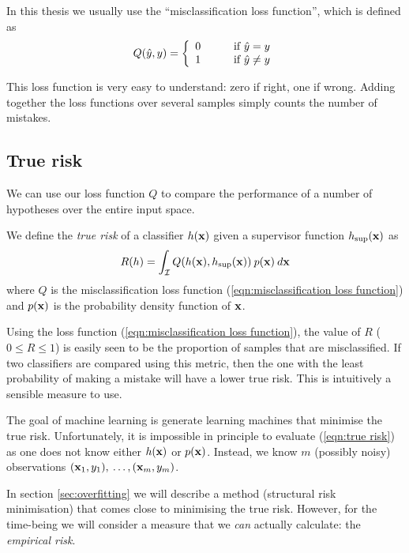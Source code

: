 In this thesis we usually use the ``misclassification loss function'',
which is defined as 
%
\begin{equation}
Q(\hat{y}, y) = \left\{
\begin{array}{ll}
	0	&	\qquad \mbox{if $\hat{y} = y$} \\
	1	&	\qquad \mbox{if $\hat{y} \neq y$}
\end{array}
\right.
\label{eqn:misclassification loss function}
\end{equation}

This loss function is very easy to understand: zero if right, one if
wrong.  Adding together the loss functions over several samples simply
counts the number of mistakes.


\subsection{True risk}
\label{sec:true risk}

We can use our loss function $Q$ to compare the performance of a
number of hypotheses over the entire input space.

\begin{definition}
We define the \emph{true risk} of a classifier $h(\mathbf{x})$ given a
supervisor function $h_{\sup}(\mathbf{x})$ as 
%
\begin{equation}
R(h) = \int_{\mathcal{I}} Q(h(\mathbf{x}), h_{\sup}(\mathbf{x})) \: p(\mathbf{x}) \: d\mathbf{x}
\label{eqn:true risk}
\end{equation}
%
where $Q$ is the misclassification loss function
(\ref{eqn:misclassification loss function}) and $p(\mathbf{x})$ is the
probability density function of $\mathbf{x}$.
\end{definition}

Using the loss function (\ref{eqn:misclassification loss function}), the
value of $R$ ($0 \leq R \leq 1$) is easily seen to be the proportion
of samples that are misclassified.  If two classifiers are compared
using this metric, then the one with the least probability of making a
mistake will have a lower true risk.  This is intuitively a sensible
measure to use.

The goal of machine learning is generate learning machines that
minimise the true risk.  Unfortunately, it is impossible in
principle to evaluate (\ref{eqn:true risk}) as one does not know
either $h(\mathbf{x})$ or $p(\mathbf{x})$.   Instead, we know $m$ (possibly noisy)
observations $(\mathbf{x}_1, y_1),\: \ldots, (\mathbf{x}_m, y_m)$.

In section \ref{sec:overfitting} we will describe a method (structural
risk minimisation) that comes close to minimising the true risk.
However, for the time-being we will consider a measure that we
\emph{can} actually calculate: the \emph{empirical risk}.


